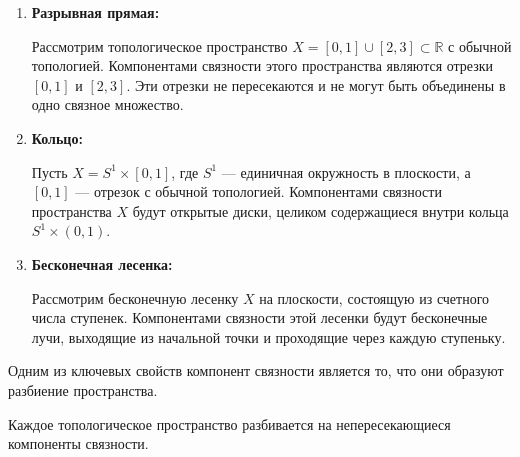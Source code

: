 \begin{example}
\begin{enumerate}
    \item \textbf{Разрывная прямая:}
    
    Рассмотрим топологическое пространство $ X = [0,1] \cup [2,3] \subset \mathbb{R} $ с обычной топологией. Компонентами связности этого пространства являются отрезки $ [0,1] $ и $ [2,3] $. Эти отрезки не пересекаются и не могут быть объединены в одно связное множество.
    
    \begin{center}
    \end{center}

    \item \textbf{Кольцо:}
    
    Пусть $ X = S^1 \times [0,1] $, где $ S^1 $ — единичная окружность в плоскости, а $ [0,1] $ — отрезок с обычной топологией. Компонентами связности пространства $ X $ будут открытые диски, целиком содержащиеся внутри кольца $ S^1 \times (0,1) $.

    \item \textbf{Бесконечная лесенка:}
    
    Рассмотрим бесконечную лесенку $ X $ на плоскости, состоящую из счетного числа ступенек. Компонентами связности этой лесенки будут бесконечные лучи, выходящие из начальной точки и проходящие через каждую ступеньку.
\end{enumerate}
\end{example}

Одним из ключевых свойств компонент связности является то, что они образуют разбиение пространства.

\begin{statement}
Каждое топологическое пространство разбивается на непересекающиеся компоненты связности.
\end{statement}

